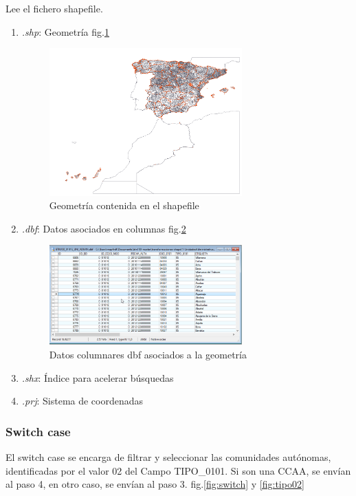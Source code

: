 Lee el fichero shapefile.
\begin{enumerate}
    \item \textit{.shp}: Geometría fig.\ref{fig:shapefile}

        \begin{figure}[H]
            \includegraphics[width=0.7\textwidth]{images/shapefile.png}
            \centering
            \caption{Geometría contenida en el shapefile}
            \label{fig:shapefile}
        \end{figure}

    \item \textit{.dbf}: Datos asociados en columnas fig.\ref{fig:dbf}

        \begin{figure}[H]
            \includegraphics[width=0.7\textwidth]{images/dbf.png}
            \centering
            \caption{Datos columnares dbf asociados a la geometría}
            \label{fig:dbf}
        \end{figure}

    \item \textit{.shx}: Índice para acelerar búsquedas
    \item \textit{.prj}: Sistema de coordenadas
\end{enumerate}

\subsubsection{Switch case}
El switch case se encarga de filtrar y seleccionar las comunidades autónomas, identificadas por el valor 02 del
Campo TIPO\_0101. Si son una CCAA, se envían al paso 4, en otro caso, se envían al paso 3. fig.\ref{fig:switch} y
\ref{fig:tipo02}

